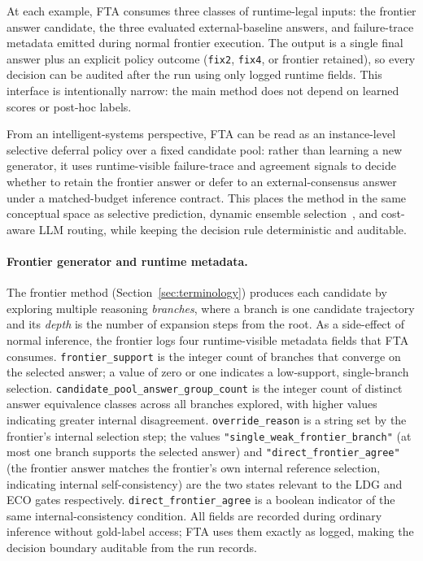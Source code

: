 \documentclass[smallcondensed]{svjour3}
\begin{document}
At each example, FTA consumes three classes of runtime-legal inputs:
the frontier answer candidate, the three evaluated external-baseline answers,
and failure-trace metadata emitted during normal frontier execution.
The output is a single final answer plus an explicit policy outcome
(\texttt{fix2}, \texttt{fix4}, or frontier retained), so every decision can be
audited after the run using only logged runtime fields.
This interface is intentionally narrow: the main method does not depend on
learned scores or post-hoc labels.

From an intelligent-systems perspective, FTA can be read as an
instance-level selective deferral policy over a fixed candidate pool:
rather than learning a new generator, it uses runtime-visible
failure-trace and agreement signals to decide whether to retain the
frontier answer or defer to an external-consensus answer under a
matched-budget inference contract.
This places the method in the same conceptual space as selective
prediction, dynamic ensemble selection~\citep{cruz2015metades}, and cost-aware LLM routing, while
keeping the decision rule deterministic and auditable.

\paragraph{Frontier generator and runtime metadata.}
The frontier method (Section~\ref{sec:terminology}) produces each candidate by exploring
multiple reasoning \emph{branches}, where a branch is one candidate trajectory and its
\emph{depth} is the number of expansion steps from the root.
As a side-effect of normal inference, the frontier logs four runtime-visible metadata
fields that FTA consumes.
\texttt{frontier\_support} is the integer count of branches that converge on the selected
answer; a value of zero or one indicates a low-support, single-branch selection.
\texttt{candidate\_pool\_answer\_group\_count} is the integer count of distinct answer
equivalence classes across all branches explored, with higher values indicating greater
internal disagreement.
\texttt{override\_reason} is a string set by the frontier's internal selection step;
the values \texttt{"single\_weak\_frontier\_branch"} (at most one branch supports the
selected answer) and \texttt{"direct\_frontier\_agree"} (the frontier answer matches the
frontier's own internal reference selection, indicating internal self-consistency) are the
two states relevant to the LDG and ECO gates respectively.
\texttt{direct\_frontier\_agree} is a boolean indicator of the same internal-consistency
condition.
All fields are recorded during ordinary inference without gold-label access; FTA uses them
exactly as logged, making the decision boundary auditable from the run records.
\end{document}
